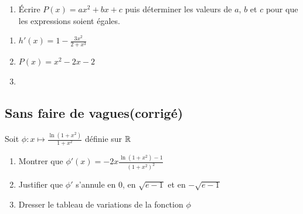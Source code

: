 \documentclass[oneside,12pt]{book}          %
\begin{document}
\begin{hint}
	\begin{enumerate}
	\item[2.] Écrire $P(x)=ax^2+bx+c$ puis déterminer les valeurs de $a$, $b$ et $c$ pour que les expressions soient égales.
	\end{enumerate}
\end{hint}
\begin{sol}
	\begin{enumerate}
		\item $h'(x)=1-\frac{3x^2}{2+x^3}$
		\item $P(x)=x^2-2x-2$
		\item {}
	\end{enumerate}
\end{sol}



\subsection{Sans faire de vagues\quad\small{(corrigé)}}
Soit $\phi:x\mapsto\frac{\ln\left(1+x^2\right)}{1+x^2}$ définie sur ${\mathbb R}$
\begin{enumerate}
	\item Montrer que $\phi'(x)=-2x\frac{\ln\left(1+x^2\right)-1}{\left(1+x^2\right)^2}$
	\item Justifier que $\phi'$ s'annule en $0$, en $\sqrt{e-1}$ et en $-\sqrt{e-1}$
	\item Dresser le tableau de variations de la fonction $\phi$
\end{enumerate}

\begin{sol}
	\vspace{10pt}
\end{sol}
\end{document}
